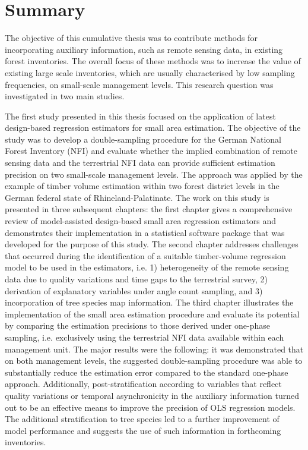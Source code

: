 \chapter*{Summary}
\label{chap:Summary}

The objective of this cumulative thesis was to contribute methods for incorporating auxiliary information, such as remote sensing data, in existing forest inventories. The overall focus of these methods was to increase the value of existing large scale inventories, which are usually characterised by low sampling frequencies, on small-scale management levels. This research question was investigated in two main studies.\par

The first study presented in this thesis focused on the application of latest design-based regression estimators for small area estimation. The objective of the study was to develop a double-sampling procedure for the German National Forest Inventory (NFI) and evaluate whether the implied combination of remote sensing data and the terrestrial NFI data can provide sufficient estimation precision on two small-scale management levels. The approach was applied by the example of timber volume estimation within two forest district levels in the German federal state of Rhineland-Palatinate. The work on this study is presented in three subsequent chapters: the first chapter gives a comprehensive review of model-assisted design-based small area regression estimators and demonstrates their implementation in a statistical software package that was developed for the purpose of this study. The second chapter addresses challenges that occurred during the identification of a suitable timber-volume regression model to be used in the estimators, i.e. 1) heterogeneity of the remote sensing data due to quality variations and time gaps to the terrestrial survey, 2) derivation of explanatory variables under angle count sampling, and 3) incorporation of tree species map information. The third chapter illustrates the implementation of the small area estimation procedure and evaluate its potential by comparing the estimation precisions to those derived under one-phase sampling, i.e. exclusively using the terrestrial NFI data available within each management unit. The major results were the following: it was demonstrated that on both management levels, the suggested double-sampling procedure was able to substantially reduce the estimation error compared to the standard one-phase approach. Additionally, post-stratification according to variables that reflect quality variations or temporal asynchronicity in the auxiliary information turned out to be an effective means to improve the precision of OLS regression models. The additional stratification to tree species led to a further improvement of model performance and suggests the use of such information in forthcoming inventories.\par

